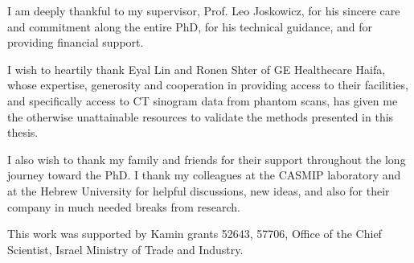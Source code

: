 \cleardoublepage
\thispagestyle{empty}
\cleardoublepage
\thispagestyle{empty}
\acknowledgements
I am deeply thankful to my supervisor, Prof. Leo Joskowicz, for his sincere care and commitment along the entire PhD, for his technical guidance, and for providing financial support.

I wish to heartily thank Eyal Lin and Ronen Shter of GE Healthecare Haifa, whose expertise, generosity and cooperation in providing access to their facilities, and specifically access to CT sinogram data from phantom scans, has given me the otherwise unattainable resources to validate the methods presented in this thesis.

I also wish to thank my family and friends for their support throughout the long journey toward the PhD. I thank my colleagues at the CASMIP laboratory and at the Hebrew University for helpful discussions, new ideas, and also for their company in much needed breaks from research.

This work was supported by Kamin grants 52643, 57706, Office of the Chief Scientist, Israel Ministry of Trade and Industry.
\thispagestyle{empty}
\clearpage
\thispagestyle{empty}
\cleardoublepage
\thispagestyle{empty}
\clearpage
